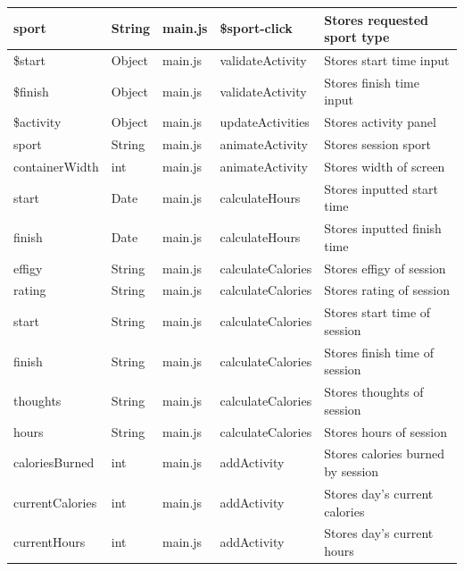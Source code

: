 \documentclass{article}[12pt,a4paper]
\begin{document}
\begin{longtable}{|l|l|l|l|l|}
sport             & String      & main.js        & \$sport-click       & Stores requested sport type         \\ \hline
\$start           & Object      & main.js        & validateActivity    & Stores start time input             \\ \hline
\$finish          & Object      & main.js        & validateActivity    & Stores finish time input            \\ \hline
\$activity        & Object      & main.js        & updateActivities    & Stores activity panel               \\ \hline
sport             & String      & main.js        & animateActivity     & Stores session sport                \\ \hline
containerWidth    & int         & main.js        & animateActivity     & Stores width of screen              \\ \hline
start             & Date        & main.js        & calculateHours      & Stores inputted start time          \\ \hline
finish            & Date        & main.js        & calculateHours      & Stores inputted finish time         \\ \hline
effigy            & String      & main.js        & calculateCalories   & Stores effigy of session            \\ \hline
rating            & String      & main.js        & calculateCalories   & Stores rating of session            \\ \hline
start             & String      & main.js        & calculateCalories   & Stores start time of session        \\ \hline
finish            & String      & main.js        & calculateCalories   & Stores finish time of session       \\ \hline
thoughts          & String      & main.js        & calculateCalories   & Stores thoughts of session          \\ \hline
hours             & String      & main.js        & calculateCalories   & Stores hours of session             \\ \hline
caloriesBurned    & int         & main.js        & addActivity         & Stores calories burned by session   \\ \hline
currentCalories   & int         & main.js        & addActivity         & Stores day's current calories       \\ \hline
currentHours      & int         & main.js        & addActivity         & Stores day's current hours          \\ \hline

\end{longtable}
\end{document}
